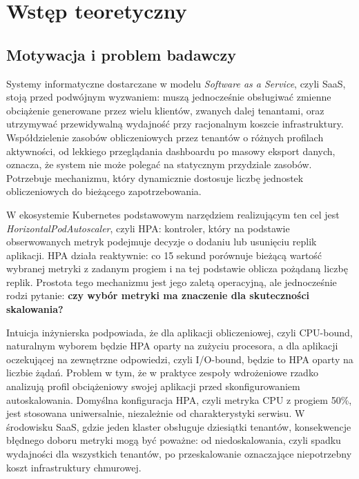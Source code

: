\chapter{Wstęp teoretyczny}

\section{Motywacja i problem badawczy}

Systemy informatyczne dostarczane w modelu \textit{Software as a Service}, czyli SaaS, stoją przed podwójnym wyzwaniem: muszą jednocześnie obsługiwać zmienne obciążenie generowane przez wielu klientów, zwanych dalej tenantami, oraz utrzymywać przewidywalną wydajność przy racjonalnym koszcie infrastruktury. Współdzielenie zasobów obliczeniowych przez tenantów o różnych profilach aktywności, od lekkiego przeglądania dashboardu po masowy eksport danych, oznacza, że system nie może polegać na statycznym przydziale zasobów. Potrzebuje mechanizmu, który dynamicznie dostosuje liczbę jednostek obliczeniowych do bieżącego zapotrzebowania.

W ekosystemie Kubernetes podstawowym narzędziem realizującym ten cel jest \textit{HorizontalPodAutoscaler}, czyli HPA: kontroler, który na podstawie obserwowanych metryk podejmuje decyzje o dodaniu lub usunięciu replik aplikacji. HPA działa reaktywnie: co 15 sekund porównuje bieżącą wartość wybranej metryki z zadanym progiem i na tej podstawie oblicza pożądaną liczbę replik. Prostota tego mechanizmu jest jego zaletą operacyjną, ale jednocześnie rodzi pytanie: \textbf{czy wybór metryki ma znaczenie dla skuteczności skalowania?}

Intuicja inżynierska podpowiada, że dla aplikacji obliczeniowej, czyli CPU-bound, naturalnym wyborem będzie HPA oparty na zużyciu procesora, a dla aplikacji oczekującej na zewnętrzne odpowiedzi, czyli I/O-bound, będzie to HPA oparty na liczbie żądań. Problem w tym, że w praktyce zespoły wdrożeniowe rzadko analizują profil obciążeniowy swojej aplikacji przed skonfigurowaniem autoskalowania. Domyślna konfiguracja HPA, czyli metryka CPU z progiem 50\%, jest stosowana uniwersalnie, niezależnie od charakterystyki serwisu. W środowisku SaaS, gdzie jeden klaster obsługuje dziesiątki tenantów, konsekwencje błędnego doboru metryki mogą być poważne: od niedoskalowania, czyli spadku wydajności dla wszystkich tenantów, po przeskalowanie oznaczające niepotrzebny koszt infrastruktury chmurowej.

